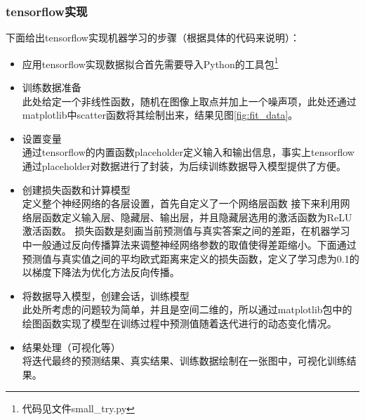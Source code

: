 \documentclass[a4paper,11pt]{ctexart}
\theoremstyle{break}
\theoremstyle{plain}
\begin{document}
\subsubsection{tensorflow实现}
下面给出tensorflow实现机器学习的步骤（根据具体的代码来说明）：
\begin{itemize}
	\item 应用tensorflow实现数据拟合首先需要导入Python的工具包\footnote{代码见文件small\_try.py}
	\item 训练数据准备\\此处给定一个非线性函数，随机在图像上取点并加上一个噪声项，此处还通过matplotlib中scatter函数将其绘制出来，结果见图\ref{fig:fit_data}。
	\item 设置变量\\
	通过tensorflow的内置函数placeholder定义输入和输出信息，事实上tensorflow通过placeholder对数据进行了封装，为后续训练数据导入模型提供了方便。
	\item 创建损失函数和计算模型\\
	定义整个神经网络的各层设置，首先自定义了一个网络层函数
	接下来利用网络层函数定义输入层、隐藏层、输出层，并且隐藏层选用的激活函数为ReLU激活函数。
	损失函数是刻画当前预测值与真实答案之间的差距，在机器学习中一般通过反向传播算法来调整神经网络参数的取值使得差距缩小。下面通过预测值与真实值之间的平均欧式距离来定义的损失函数，定义了学习虑为0.1的以梯度下降法为优化方法反向传播。
	\item 将数据导入模型，创建会话，训练模型\\
	此处所考虑的问题较为简单，并且是空间二维的，所以通过matplotlib包中的绘图函数实现了模型在训练过程中预测值随着迭代进行的动态变化情况。
	\item 结果处理（可视化等）\\
	将迭代最终的预测结果、真实结果、训练数据绘制在一张图中，可视化训练结果。
\end{itemize}
\end{document}
